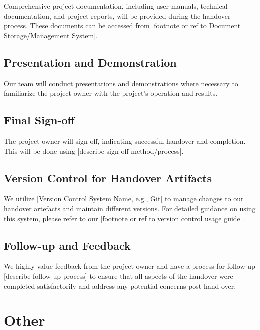 \documentclass[10pt]{projectdoc}
\begin{document}
Comprehensive project documentation, including user manuals, technical documentation, and project reports, will be provided during the handover process. These documents can be accessed from [footnote or ref to Document Storage/Management System].

\subsection{Presentation and Demonstration}

Our team will conduct presentations and demonstrations where necessary to familiarize the project owner with the project's operation and results.

\subsection{Final Sign-off}

The project owner will sign off, indicating successful handover and completion. This will be done using [describe sign-off method/process].

\subsection{Version Control for Handover Artifacts}

We utilize [Version Control System Name, e.g., Git] to manage changes to our handover artefacts and maintain different versions. For detailed guidance on using this system, please refer to our [footnote or ref to version control usage guide].

\subsection{Follow-up and Feedback}

We highly value feedback from the project owner and have a process for follow-up [describe follow-up process] to ensure that all aspects of the handover were completed satisfactorily and address any potential concerns post-hand-over.

\newpage
\section{Other}

\newpage



\end{document}
